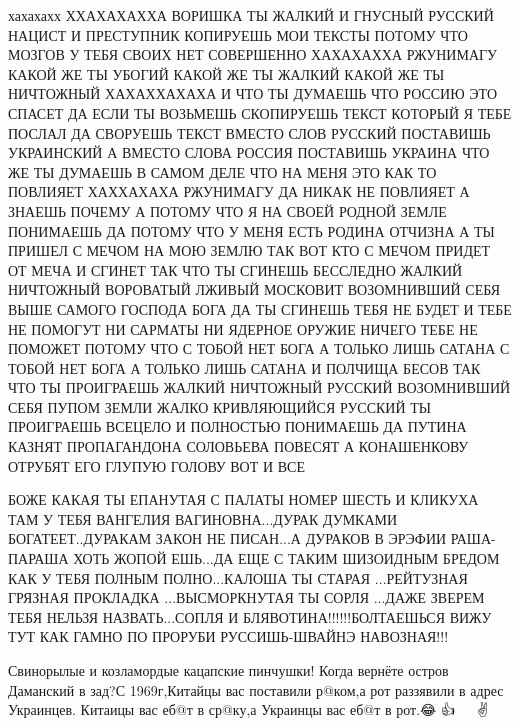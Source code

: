 хахахахх ХХАХАХАХХА ВОРИШКА ТЫ ЖАЛКИЙ И ГНУСНЫЙ РУССКИЙ НАЦИСТ И ПРЕСТУПНИК КОПИРУЕШЬ
МОИ ТЕКСТЫ ПОТОМУ ЧТО МОЗГОВ У ТЕБЯ СВОИХ НЕТ СОВЕРШЕННО ХАХАХАХХА РЖУНИМАГУ
КАКОЙ ЖЕ ТЫ УБОГИЙ КАКОЙ ЖЕ ТЫ ЖАЛКИЙ КАКОЙ ЖЕ ТЫ НИЧТОЖНЫЙ ХАХАХХАХАХА
И ЧТО ТЫ ДУМАЕШЬ ЧТО РОССИЮ ЭТО СПАСЕТ ДА ЕСЛИ ТЫ ВОЗЬМЕШЬ СКОПИРУЕШЬ ТЕКСТ
КОТОРЫЙ Я ТЕБЕ ПОСЛАЛ ДА СВОРУЕШЬ ТЕКСТ ВМЕСТО СЛОВ РУССКИЙ ПОСТАВИШЬ УКРАИНСКИЙ
А ВМЕСТО СЛОВА РОССИЯ ПОСТАВИШЬ УКРАИНА ЧТО ЖЕ ТЫ ДУМАЕШЬ В САМОМ ДЕЛЕ
ЧТО НА МЕНЯ ЭТО КАК ТО ПОВЛИЯЕТ ХАХХАХАХА РЖУНИМАГУ ДА НИКАК НЕ ПОВЛИЯЕТ А ЗНАЕШЬ ПОЧЕМУ
А ПОТОМУ ЧТО Я НА СВОЕЙ РОДНОЙ ЗЕМЛЕ ПОНИМАЕШЬ ДА ПОТОМУ ЧТО У МЕНЯ ЕСТЬ РОДИНА ОТЧИЗНА
А ТЫ ПРИШЕЛ С МЕЧОМ НА МОЮ ЗЕМЛЮ ТАК ВОТ КТО С МЕЧОМ ПРИДЕТ ОТ МЕЧА И СГИНЕТ ТАК ЧТО
ТЫ СГИНЕШЬ БЕССЛЕДНО ЖАЛКИЙ НИЧТОЖНЫЙ ВОРОВАТЫЙ ЛЖИВЫЙ МОСКОВИТ ВОЗОМНИВШИЙ СЕБЯ ВЫШЕ САМОГО ГОСПОДА 
БОГА ДА ТЫ СГИНЕШЬ ТЕБЯ НЕ БУДЕТ И ТЕБЕ НЕ ПОМОГУТ НИ САРМАТЫ НИ ЯДЕРНОЕ ОРУЖИЕ НИЧЕГО
ТЕБЕ НЕ ПОМОЖЕТ ПОТОМУ ЧТО С ТОБОЙ НЕТ БОГА А ТОЛЬКО ЛИШЬ САТАНА С ТОБОЙ НЕТ БОГА А ТОЛЬКО ЛИШЬ
САТАНА И ПОЛЧИЩА БЕСОВ ТАК ЧТО ТЫ ПРОИГРАЕШЬ ЖАЛКИЙ НИЧТОЖНЫЙ РУССКИЙ ВОЗОМНИВШИЙ СЕБЯ ПУПОМ ЗЕМЛИ
ЖАЛКО КРИВЛЯЮЩИЙСЯ РУССКИЙ ТЫ ПРОИГРАЕШЬ ВСЕЦЕЛО И ПОЛНОСТЬЮ ПОНИМАЕШЬ ДА
ПУТИНА КАЗНЯТ ПРОПАГАНДОНА СОЛОВЬЕВА ПОВЕСЯТ А КОНАШЕНКОВУ ОТРУБЯТ ЕГО ГЛУПУЮ ГОЛОВУ
ВОТ И ВСЕ

БОЖЕ КАКАЯ ТЫ ЕПАНУТАЯ С ПАЛАТЫ НОМЕР ШЕСТЬ И КЛИКУХА ТАМ У ТЕБЯ ВАНГЕЛИЯ
ВАГИНОВНА...ДУРАК ДУМКАМИ БОГАТЕЕТ..ДУРАКАМ ЗАКОН НЕ ПИСАН...А ДУРАКОВ В ЭРЭФИИ
РАША-ПАРАША ХОТЬ ЖОПОЙ ЕШЬ...ДА ЕЩЕ С ТАКИМ ШИЗОИДНЫМ БРЕДОМ КАК У ТЕБЯ ПОЛНЫМ
ПОЛНО...КАЛОША ТЫ СТАРАЯ ...РЕЙТУЗНАЯ ГРЯЗНАЯ ПРОКЛАДКА ...ВЫСМОРКНУТАЯ ТЫ
СОРЛЯ ...ДАЖЕ ЗВЕРЕМ ТЕБЯ НЕЛЬЗЯ НАЗВАТЬ...СОПЛЯ И БЛЯВОТИНА!!!!!!БОЛТАЕШЬСЯ
ВИЖУ ТУТ КАК ГАМНО ПО ПРОРУБИ РУССИШЬ-ШВАЙНЭ НАВОЗНАЯ!!!

Свинорылые и козламордые кацапские пинчушки!  Когда вернёте остров Даманский в
зад?С 1969г,Китайцы вас поставили р@ком,а рот раззявили в адрес Украинцев.
Китаицы вас еб@т в ср@ку,а Украинцы вас еб@т в рот.😂 👍 💙 💛 ✌


